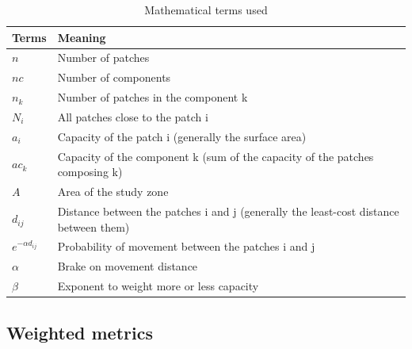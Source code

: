 \documentclass{article}
\begin{document}
\bigskip

\begin{table}[H]
	\begin{tabular}{|m{2cm}|m{13cm}|}
		\hline
		Terms & Meaning\\\hline
		$n$	& Number of patches\\\hline
		$nc$ & Number of components\\\hline
		${n}_{k}$ &	Number of patches in the component k\\\hline
		${N}_{i}$ &	All patches close to the patch i\\\hline
		${a}_{i}$ &	Capacity of the patch i (generally the surface area)\\\hline
		${ac}_{k}$ & Capacity of the component k (sum of the capacity of the patches composing k)\\\hline
		$A$	& Area of the study zone \\\hline
		${d}_{ij}$ & Distance between the patches i and j (generally the least-cost distance between them) \\\hline
		${e}^{-\alpha {d}_{ij}}$ & Probability of movement between the patches i and j\\\hline
		$\alpha$ & Brake on movement distance  \\\hline
		$\beta$	& Exponent to weight more or less capacity\\\hline
	\end{tabular}
	\caption{Mathematical terms used}
\end{table}


\subsection{Weighted metrics}
\label{weight_metric}
\end{document}

